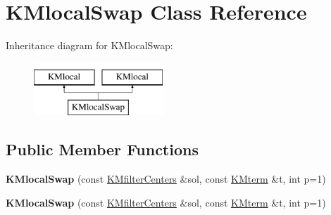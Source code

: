 \hypertarget{class_k_mlocal_swap}{
\section{KMlocalSwap Class Reference}
\label{class_k_mlocal_swap}
}
Inheritance diagram for KMlocalSwap:\begin{figure}[H]
\begin{center}
\leavevmode
\includegraphics[height=2cm]{class_k_mlocal_swap}
\end{center}
\end{figure}
\subsection*{Public Member Functions}
\begin{DoxyCompactItemize}
\item 
\hypertarget{class_k_mlocal_swap_a12b03db7bef337ce188f1a85adb99db6}{
{\bfseries KMlocalSwap} (const \hyperlink{class_k_mfilter_centers}{KMfilterCenters} \&sol, const \hyperlink{class_k_mterm}{KMterm} \&t, int p=1)}
\label{class_k_mlocal_swap_a12b03db7bef337ce188f1a85adb99db6}

\item 
\hypertarget{class_k_mlocal_swap_a12b03db7bef337ce188f1a85adb99db6}{
{\bfseries KMlocalSwap} (const \hyperlink{class_k_mfilter_centers}{KMfilterCenters} \&sol, const \hyperlink{class_k_mterm}{KMterm} \&t, int p=1)}
\label{class_k_mlocal_swap_a12b03db7bef337ce188f1a85adb99db6}

\end{DoxyCompactItemize}
